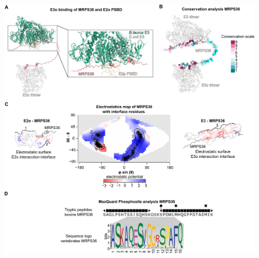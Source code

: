 \begin{subappendices}
    \begin{figure}[hbt!]
        \center
        \includegraphics[width=\textwidth]{Chapter.5/Figures/Figure_S3.png} 

\end{figure}
\end{subappendices}
